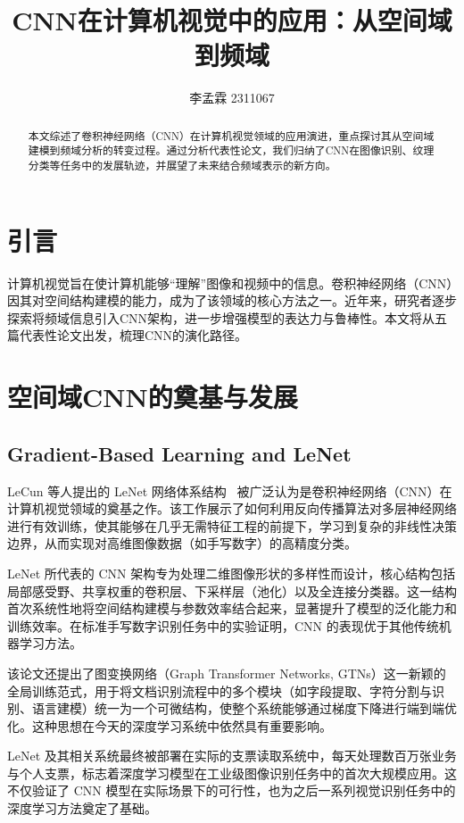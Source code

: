 \documentclass[12pt]{article}
\title{\textbf{CNN在计算机视觉中的应用：从空间域到频域}}
\author{李孟霖 2311067}
\date{}
\begin{document}
\maketitle

\begin{abstract}
本文综述了卷积神经网络（CNN）在计算机视觉领域的应用演进，重点探讨其从空间域建模到频域分析的转变过程。通过分析代表性论文，我们归纳了CNN在图像识别、纹理分类等任务中的发展轨迹，并展望了未来结合频域表示的新方向。
\end{abstract}

\section{引言}

计算机视觉旨在使计算机能够“理解”图像和视频中的信息。卷积神经网络（CNN）因其对空间结构建模的能力，成为了该领域的核心方法之一。近年来，研究者逐步探索将频域信息引入CNN架构，进一步增强模型的表达力与鲁棒性。本文将从五篇代表性论文出发，梳理CNN的演化路径。

\section{空间域CNN的奠基与发展}

\subsection{Gradient-Based Learning and LeNet}


LeCun 等人提出的 LeNet 网络体系结构 ~\cite{lecun1998gradient}被广泛认为是卷积神经网络（CNN）在计算机视觉领域的奠基之作。该工作展示了如何利用反向传播算法对多层神经网络进行有效训练，使其能够在几乎无需特征工程的前提下，学习到复杂的非线性决策边界，从而实现对高维图像数据（如手写数字）的高精度分类。

LeNet 所代表的 CNN 架构专为处理二维图像形状的多样性而设计，核心结构包括局部感受野、共享权重的卷积层、下采样层（池化）以及全连接分类器。这一结构首次系统性地将空间结构建模与参数效率结合起来，显著提升了模型的泛化能力和训练效率。在标准手写数字识别任务中的实验证明，CNN 的表现优于其他传统机器学习方法。

该论文还提出了图变换网络（Graph Transformer Networks, GTNs）这一新颖的全局训练范式，用于将文档识别流程中的多个模块（如字段提取、字符分割与识别、语言建模）统一为一个可微结构，使整个系统能够通过梯度下降进行端到端优化。这种思想在今天的深度学习系统中依然具有重要影响。

LeNet 及其相关系统最终被部署在实际的支票读取系统中，每天处理数百万张业务与个人支票，标志着深度学习模型在工业级图像识别任务中的首次大规模应用。这不仅验证了 CNN 模型在实际场景下的可行性，也为之后一系列视觉识别任务中的深度学习方法奠定了基础。
\end{document}
